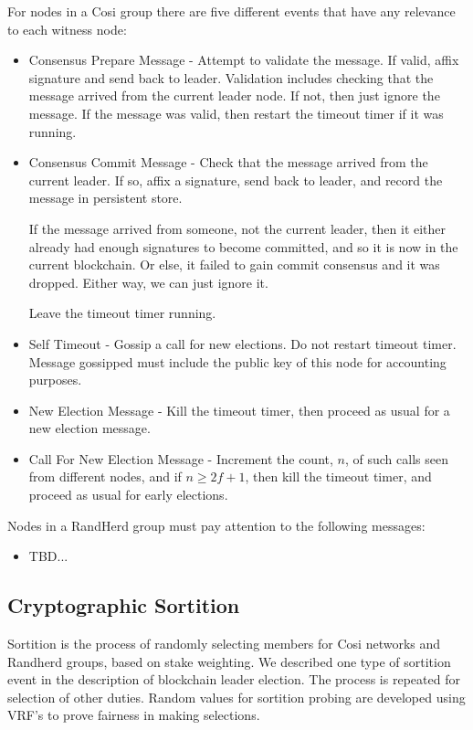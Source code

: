 \documentclass{yellowpaper}
\begin{document}
For nodes in a Cosi group there are five different events that have any relevance to each witness node: 
\begin{itemize}
\item Consensus Prepare Message - Attempt to validate the message. If valid, affix signature and send back to leader. Validation includes checking that the message arrived from the current leader node. If not, then just ignore the message. If the message was valid, then restart the timeout timer if it was running.

\item Consensus Commit Message - Check that the message arrived from the current leader. If so, affix a signature, send back to leader, and record the message in persistent store.

If the message arrived from someone, not the current leader, then it either already had enough signatures to become committed, and so it is now in the current blockchain. Or else, it failed to gain commit consensus and it was dropped. Either way, we can just ignore it.

Leave the timeout timer running.

\item Self Timeout - Gossip a call for new elections. Do not restart timeout timer. Message gossipped must include the public key of this node for accounting purposes.

\item New Election Message - Kill the timeout timer, then proceed as usual for a new election message.

\item Call For New Election Message - Increment the count, $n$,  of such calls seen from different nodes, and if $n \ge 2 f +1$, then kill the timeout timer, and proceed as usual for early elections.
\end{itemize}

Nodes in a RandHerd group must pay attention to the following messages:
\begin{itemize}
\item TBD...
\end{itemize}

\subsection{Cryptographic Sortition}
Sortition\cite{algorand} is the process of randomly selecting members for Cosi networks and Randherd groups, based on stake weighting. We described one type of sortition event in the description of blockchain leader election. The process is repeated for selection of other duties. Random values for sortition probing are developed using VRF's to prove fairness in making selections.
\end{document}
